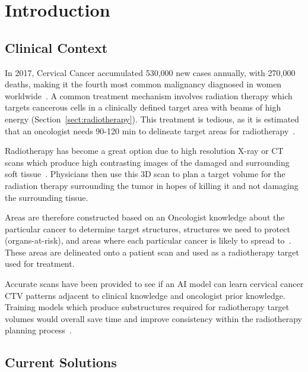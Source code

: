 \documentclass[12pt,twoside]{report}
\begin{document}
\chapter{Introduction}\label{sect:intro}

\setcounter{page}{1}
\fancyhead[LE,RO]{\slshape \rightmark}
\fancyhead[LO,RE]{\slshape \leftmark}

\section{Clinical Context}



In 2017, Cervical Cancer accumulated 530,000 new cases annually, with 270,000 deaths, making it the fourth most common malignancy diagnosed in women worldwide~\cite{cervical-cancer-epidemic}. A common treatment mechanism involves radiation therapy which targets cancerous cells in a clinically defined target area with beams of high energy (Section~\ref{sect:radiotherapy}). This treatment is tedious, as it is estimated that an oncologist needs 90-120 min to delineate target areas for radiotherapy~\cite{LIU2020184}.

Radiotherapy has become a great option due to high resolution X-ray or CT scans which produce high contrasting images of the damaged and surrounding soft tissue~\cite{radiotherapy-basic-concepts}. Physicians then use this 3D scan to plan a target volume for the radiation therapy surrounding the tumor in hopes of killing it and not damaging the surrounding tissue.

Areas are therefore constructed based on an Oncologist knowledge about the particular cancer to determine target structures, structures we need to protect (organs-at-risk), and areas where each particular cancer is likely to spread to~\cite{AMLART-data}. These areas are delineated onto a patient scan and used as a radiotherapy target used for treatment.

Accurate scans have been provided to see if an AI model can learn cervical cancer CTV patterns adjacent to clinical knowledge and oncologist prior knowledge. Training models which produce substructures required for radiotherapy target volumes would overall save time and improve consistency within the radiotherapy planning process~\cite{AMLART-data}.

\section{Current Solutions}\label{sect:current-solutions}
\end{document}

